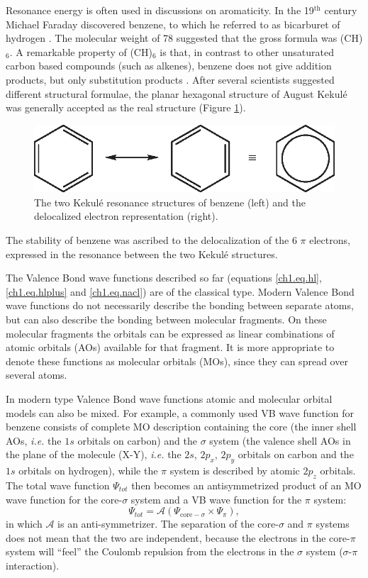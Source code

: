 Resonance energy is often used in discussions on aromaticity. In the 19$^\mathrm{th}$ century Michael Faraday discovered benzene, to which he referred to as bicarburet of hydrogen \cite{faraday,bicarburet}. The molecular weight of 78 suggested that the gross formula was (CH)$_6$. A remarkable property of (CH)$_6$ is that, in contrast to other unsaturated carbon based compounds (such as alkenes), benzene does not give addition products, but only substitution products \cite{bruice}. After several scientists suggested different structural formulae, the planar hexagonal structure of August Kekul\'e \cite{kekule} was generally accepted as the real structure (Figure \ref{ch1.fig.benzene}). 
\begin{figure}[htdp]
\center
\includegraphics{introduction/figures/benzene.eps}
\caption{The two Kekul\'e resonance structures of benzene (left) and the delocalized electron representation (right).}
\label{ch1.fig.benzene}
\end{figure}
The stability of benzene was ascribed to the delocalization of the 6 $\pi$ electrons, expressed in the resonance between the two Kekul\'e structures.

The Valence Bond wave functions described so far (equations \ref{ch1.eq.hl},\ref{ch1.eq.hlplus} and \ref{ch1.eq.nacl}) are of the classical type. Modern Valence Bond wave functions do not necessarily describe the bonding between separate atoms, but can also describe the bonding between molecular fragments. On these molecular fragments the orbitals can be expressed as linear combinations of atomic orbitals (AOs) available for that fragment. It is more appropriate to denote these functions as molecular orbitals (MOs), since they can spread over several atoms. 

In modern type Valence Bond wave functions atomic and molecular orbital models can also be mixed. For example, a commonly used VB wave function for benzene consists of complete MO description containing the core (the inner shell AOs, \textit{i.e.} the $1s$ orbitals on carbon) and the $\sigma$ system (the valence shell AOs in the plane of the molecule (X-Y), \textit{i.e.} the $2s$, $2p_x$, $2p_y$ orbitals on carbon and the $1s$ orbitals on hydrogen), while the $\pi$ system is described by atomic $2p_z$ orbitals. The total wave function $\Psi_{tot}$ then becomes an antisymmetrized product of an MO wave function for the core-$\sigma$ system and a VB wave function for the $\pi$ system:
\begin{equation}
\Psi_{tot} = \mathcal{A}(\Psi_{\mathrm{core}-\sigma} \times \Psi_{\pi}),
\label{ch1.eq.prodbenzene}
\end{equation}
in which $\mathcal{A}$ is an anti-symmetrizer. The separation of the core-$\sigma$ and $\pi$ systems does not mean that the two are independent, because the electrons in the core-$\pi$ system will ``feel'' the Coulomb repulsion from the electrons in the $\sigma$ system ($\sigma$-$\pi$ interaction).

